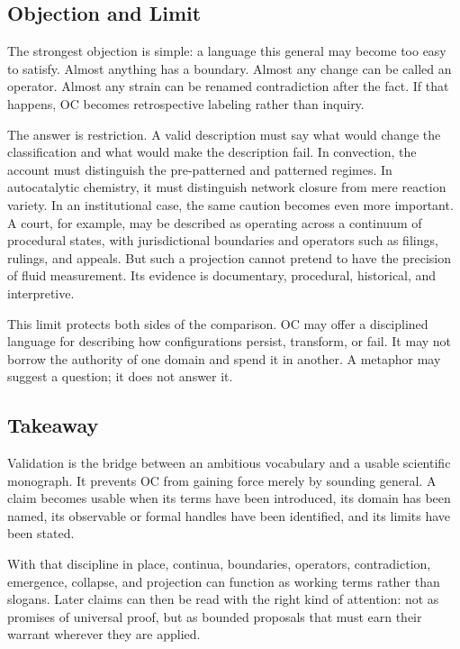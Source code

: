\documentclass[11pt,a4paper,openany]{book}
\begin{document}
\subsection{Objection and Limit}
The strongest objection is simple: a language this general may become too easy to satisfy. Almost anything has a boundary. Almost any change can be called an operator. Almost any strain can be renamed contradiction after the fact. If that happens, OC becomes retrospective labeling rather than inquiry. \cite{prigogine_dissipative,haken_synergetics}\par
The answer is restriction. A valid description must say what would change the classification and what would make the description fail. In convection, the account must distinguish the pre-patterned and patterned regimes. In autocatalytic chemistry, it must distinguish network closure from mere reaction variety. In an institutional case, the same caution becomes even more important. A court, for example, may be described as operating across a continuum of procedural states, with jurisdictional boundaries and operators such as filings, rulings, and appeals. But such a projection cannot pretend to have the precision of fluid measurement. Its evidence is documentary, procedural, historical, and interpretive.\par
This limit protects both sides of the comparison. OC may offer a disciplined language for describing how configurations persist, transform, or fail. It may not borrow the authority of one domain and spend it in another. A metaphor may suggest a question; it does not answer it.\par
\subsection{Takeaway}
Validation is the bridge between an ambitious vocabulary and a usable scientific monograph. It prevents OC from gaining force merely by sounding general. A claim becomes usable when its terms have been introduced, its domain has been named, its observable or formal handles have been identified, and its limits have been stated. \cite{prigogine_dissipative,haken_synergetics}\par
With that discipline in place, continua, boundaries, operators, contradiction, emergence, collapse, and projection can function as working terms rather than slogans. Later claims can then be read with the right kind of attention: not as promises of universal proof, but as bounded proposals that must earn their warrant wherever they are applied.\par
\end{document}

